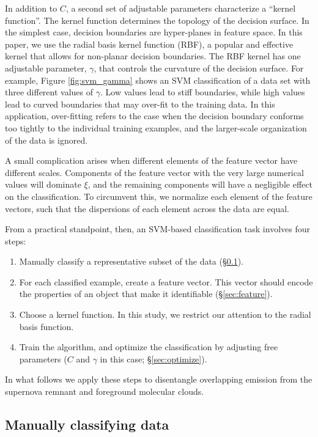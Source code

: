 In addition to $C$, a second set of adjustable parameters characterize a ``kernel function''. The kernel function determines the topology of the decision surface. In the simplest case, decision boundaries are hyper-planes in feature space. In this paper, we use the radial basis kernel function (RBF), a popular and effective kernel that allows for non-planar decision boundaries. The RBF kernel has one adjustable parameter, $\gamma$, that controls the curvature of the decision surface. For example, Figure \ref{fig:svm_gamma} shows an SVM classification of a data set with three different values of $\gamma$. Low values lead to stiff boundaries, while high values lead to curved boundaries that may over-fit to the training data. In this application, over-fitting refers to the case when the decision boundary conforms too tightly to the individual training examples, and the larger-scale organization of the data is ignored.

A small complication arises when different elements of the feature vector have different scales. Components of the feature vector with the very large numerical values will dominate $\xi$, and the remaining components will have a negligible effect on the classification. To circumvent this, we normalize each element of the feature vectors, such that the dispersions of each element across the data are equal.

From a practical standpoint, then, an SVM-based classification task involves four steps:
\begin{enumerate}
\item Manually classify a representative subset of the data (\S \ref{sec:train}).
\item For each classified example, create a feature vector. This vector should encode the properties of an object that make it identifiable (\S \ref{sec:feature}).
\item Choose a kernel function. In this study, we restrict our attention to the radial basis function.
\item Train the algorithm, and optimize the classification by adjusting free parameters ($C$ and $\gamma$ in this case; \S \ref{sec:optimize}).
\end{enumerate}

In what follows we apply these steps to disentangle overlapping emission from the supernova remnant \snr{} and foreground molecular clouds.

\subsection{Manually classifying data}
\label{sec:train}

